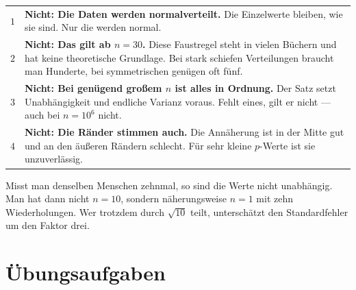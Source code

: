 \begin{warnung}
\begin{center}
\renewcommand{\arraystretch}{1.55}
\begin{tabular}{@{}P{1.0cm}P{7.4cm}@{}}
\toprule
$1$ & \textbf{Nicht: Die Daten werden normalverteilt.} Die Einzelwerte bleiben, wie sie sind. Nur die  werden normal.\\
$2$ & \textbf{Nicht: Das gilt ab $n = 30$.} Diese Faustregel steht in vielen Büchern und hat keine theoretische Grundlage. Bei stark schiefen Verteilungen braucht man Hunderte, bei symmetrischen genügen oft fünf.\\
$3$ & \textbf{Nicht: Bei genügend großem $n$ ist alles in Ordnung.} Der Satz setzt Unabhängigkeit und endliche Varianz voraus. Fehlt eines, gilt er nicht --- auch bei $n = 10^6$ nicht.\\
$4$ & \textbf{Nicht: Die Ränder stimmen auch.} Die Annäherung ist in der Mitte gut und an den äußeren Rändern schlecht. Für sehr kleine $p$-Werte ist sie unzuverlässig.\\
\bottomrule
\end{tabular}
\end{center}

Misst man denselben Menschen zehnmal, so sind die Werte nicht unabhängig. Man hat dann nicht $n=10$, sondern näherungsweise $n=1$ mit zehn Wiederholungen. Wer trotzdem durch $\sqrt{10}$ teilt, unterschätzt den Standardfehler um den Faktor drei.

\begin{center}
\begin{minipage}{0.88\textwidth}
\end{minipage}
\end{center}
\end{warnung}

\section{Übungsaufgaben}


